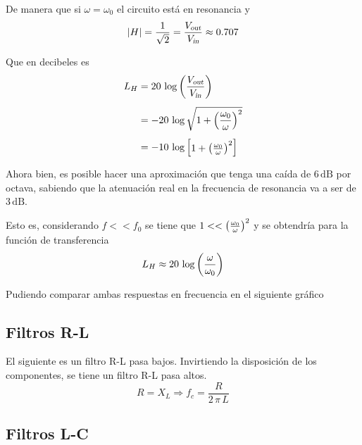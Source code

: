 \documentclass[a5paper,12pt,twoside]{book}
\begin{document}
De manera que si $\omega = \omega_0$ el circuito está en resonancia y
\begin{equation*}
    {\left| {H} \right|} = \frac{1}{\sqrt{2}} = \frac{{{V}_\textsl{{out}}}}{{{V}_\textsl{{in}}}} \approx 0.707
\end{equation*}

Que en decibeles es
\begin{align*}
    L_H &= 20 \, \log \left(\frac{{{V}_\textsl{{out}}}}{{{V}_\textsl{{in}}}}\right)
    \\[1ex]
    &= -20 \, \log \sqrt{1 + \left(\frac{\omega_0}{\omega}\right)^2}
    \\[1ex]
    &= -10 \, \log { \begin{bmatrix} 1 + \left(\frac{\omega_0}{\omega}\right)^2 \end{bmatrix} }
\end{align*}

Ahora bien, es posible hacer una aproximación que tenga una caída de $6 \, \si{\deci \bel}$ por octava, sabiendo que la atenuación real en la frecuencia de resonancia va a ser de $3 \, \si{\deci \bel}$.

Esto es, considerando $f << f_0$ se tiene que $1 << \left(\tfrac{\omega_0}{\omega}\right)^2$ y se obtendría para la función de transferencia
\begin{equation*}
    L_H \approx 20 \, \log \left(\frac{\omega}{\omega_0}\right)
\end{equation*}

Pudiendo comparar ambas respuestas en frecuencia en el siguiente gráfico

\begin{center}
    \def\svgwidth{\linewidth}
    
\end{center}


\subsection{Filtros R-L}

El siguiente es un filtro R-L pasa bajos.
Invirtiendo la disposición de los componentes, se tiene un filtro R-L pasa altos.
\begin{equation*}
    R = X_L \Rightarrow f_c = \frac{R}{2 \, \pi \, L}
\end{equation*}

\begin{center}
    \def\svgwidth{0.6\linewidth}
    
\end{center}


\subsection{Filtros L-C}
\end{document}
